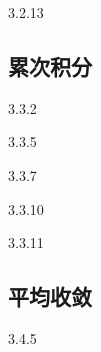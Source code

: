   {3.2.13}

   
\begin{solution}

\end{solution}

\subsection{累次积分}
  {3.3.2}

   
\begin{solution}

\end{solution}


  {3.3.5}

   
\begin{solution}

\end{solution}


  {3.3.7}

   
\begin{solution}

\end{solution}


  {3.3.10}

   
\begin{solution}

\end{solution}


  {3.3.11}

   
\begin{solution}

\end{solution}


\subsection{平均收敛}
  {3.4.5}

   
\begin{solution}

\end{solution}


